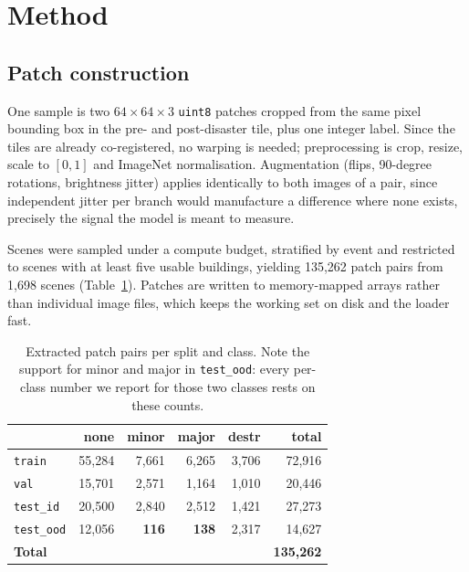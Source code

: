 \documentclass[10pt,twocolumn]{article}
\newcommand{\class}[1]{\textsf{#1}}
\begin{document}
\section{Method}

\subsection{Patch construction}

One sample is two $64\times64\times3$ \texttt{uint8} patches cropped from the same pixel bounding box
in the pre- and post-disaster tile, plus one integer label. Since the tiles are already co-registered,
no warping is needed; preprocessing is crop, resize, scale to $[0,1]$ and ImageNet normalisation.
Augmentation (flips, 90-degree rotations, brightness jitter) applies identically to both images of a
pair, since independent jitter per branch would manufacture a difference where none exists, precisely
the signal the model is meant to measure.

Scenes were sampled under a compute budget, stratified by event and restricted to scenes with at
least five usable buildings, yielding 135,262 patch pairs from 1,698 scenes
(Table~\ref{tab:patches}). Patches are written to memory-mapped arrays rather than individual image
files, which keeps the working set on disk and the loader fast.

\begin{table}[t]
\centering
\footnotesize
\caption{Extracted patch pairs per split and class. Note the support for \class{minor} and
\class{major} in \texttt{test\_ood}: every per-class number we report for those two classes rests on
these counts.}
\label{tab:patches}
\begin{tabular}{@{}lrrrrr@{}}
\toprule
& \class{none} & \class{minor} & \class{major} & \class{destr} & \textbf{total} \\
\midrule
\texttt{train}     & 55,284 & 7,661 & 6,265 & 3,706 & 72,916 \\
\texttt{val}       & 15,701 & 2,571 & 1,164 & 1,010 & 20,446 \\
\texttt{test\_id}  & 20,500 & 2,840 & 2,512 & 1,421 & 27,273 \\
\texttt{test\_ood} & 12,056 & \textbf{116} & \textbf{138} & 2,317 & 14,627 \\
\midrule
\textbf{Total}     & & & & & \textbf{135,262} \\
\bottomrule
\end{tabular}
\end{table}
\end{document}
